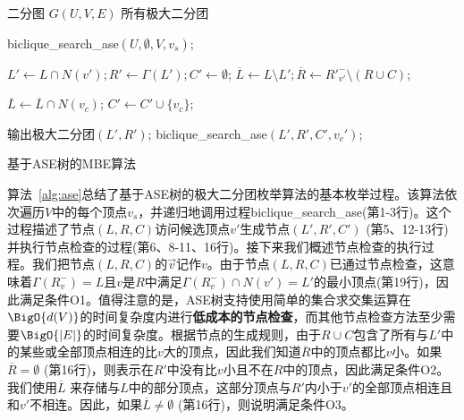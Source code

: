 \begin{algorithm}[H]
  \begin{algorithmic}[1]
      \normalsize
      \REQUIRE 二分图 $G(U,V,E)$
      \ENSURE 所有极大二分团
      
      \renewcommand{\algorithmicdo}{\textbf{do}}
        \STATE \textsf{biclique\_search\_ase}$(U,\emptyset,V,v_s)$;
      \ENDFOR

      \renewcommand{\algorithmicwhile}{\textbf{procedure}}
      \renewcommand{\algorithmicdo}{\textbf{:}}
      \renewcommand{\algorithmicdo}{\textbf{do}}
      \STATE $L' \leftarrow L \cap N(v'); R' \leftarrow \Gamma(L'); C' \leftarrow \emptyset$;
      \STATE $\overline{L}\leftarrow L \setminus L'; \overline{R}\leftarrow {R'}_{v'}^- \setminus (R \cup C)$;

              \STATE $\overline{L} \leftarrow \overline{L} \cap N(v_c)$; 
            \ENDIF
            \STATE $C' \leftarrow C' \cup \{v_c\}$;
          \ENDIF
        \ENDFOR

          \STATE 输出极大二分团$(L', R')$;
              \STATE \textsf{biclique\_search\_ase}$(L', R', C', v_c')$;
            \ENDIF
          \ENDFOR
        \ENDIF
      \ENDWHILE

  \end{algorithmic}
  \caption{基于ASE树的MBE算法}
  \label{alg:ase}
\end{algorithm}


算法~\ref{alg:ase}总结了基于ASE树的极大二分团枚举算法的基本枚举过程。该算法依次遍历$V$中的每个顶点$v_s$，并递归地调用过程\textsf{biclique\_search\_ase}(第1-3行)。这个过程描述了节点$(L,R,C)$访问候选顶点$v'$生成节点$(L',R',C')$ (第5、12-13行)并执行节点检查的过程(第6、8-11、16行)。接下来我们概述节点检查的执行过程。我们把节点$(L,R,C)$的$\vec{v}$记作$v$。由于节点$(L,R,C)$已通过节点检查，这意味着$\Gamma(R_v^-) = L$且$v$是$R$中满足$\Gamma(R_v^-) \cap N(v') = L'$的最小顶点(第19行)，因此满足条件O1。值得注意的是，ASE树支持使用简单的集合求交集运算在$\BigO{d(V)}$的时间复杂度内进行\textbf{低成本的节点检查}，而其他节点检查方法至少需要$\BigO{|E|}$的时间复杂度。根据节点的生成规则，由于$R \cup C$包含了所有与$L'$中的某些或全部顶点相连的比$v$大的顶点，因此我们知道$\overline{R}$中的顶点都比$v$小。如果$\overline{R} = \emptyset$ (第16行)，则表示在$R'$中没有比$v$小且不在$R$中的顶点，因此满足条件O2。我们使用$\overline{L}$ 来存储与$L$中的部分顶点，这部分顶点与$R'$内小于$v'$的全部顶点相连且和$v'$不相连。因此，如果$\overline{L} \neq \emptyset$ (第16行)，则说明满足条件O3。

